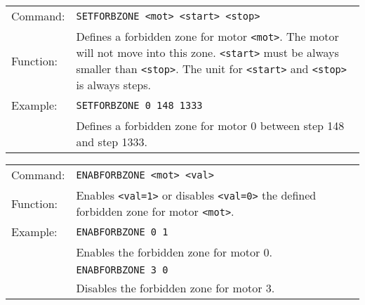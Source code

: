 \vspace{\vdistace}

\begin{table}[h]
  \begin{tabularx}{\textwidth}{lX}
    Command:  & \texttt{SETFORBZONE <mot> <start> <stop>}\\
    Function: & Defines a forbidden zone for motor \texttt{<mot>}.
                The motor will not move into this zone. \texttt{<start>} must
                be always smaller than \texttt{<stop>}. The unit for \texttt{<start>}
                and \texttt{<stop>} is always steps.\\
    Example:  & \texttt{SETFORBZONE 0 148 1333}\\
              & Defines a forbidden zone for motor 0 between step 148 and step 1333.
  \end{tabularx}
\end{table}

\vspace{\vdistace}

\begin{table}[h]
  \begin{tabularx}{\textwidth}{lX}
    Command:  & \texttt{ENABFORBZONE <mot> <val>}\\
    Function: & Enables \texttt{<val=1>} or disables \texttt{<val=0>} the
                defined forbidden zone for motor \texttt{<mot>}.\\
    Example:  & \texttt{ENABFORBZONE 0 1}\\
              & Enables the forbidden zone for motor 0.\\
              & \texttt{ENABFORBZONE 3 0}\\
              & Disables the forbidden zone for motor 3.
  \end{tabularx}
\end{table}

\vspace{\vdistace}

